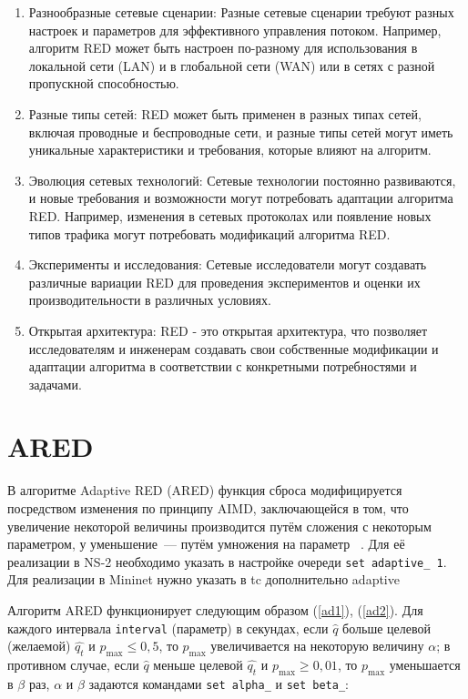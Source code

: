 \begin{enumerate}
\item Разнообразные сетевые сценарии: Разные сетевые сценарии требуют разных настроек и параметров для эффективного управления потоком. Например, алгоритм RED может быть настроен по-разному для использования в локальной сети (LAN) и в глобальной сети (WAN) или в сетях с разной пропускной способностью.
\item Разные типы сетей: RED может быть применен в разных типах сетей, включая проводные и беспроводные сети, и разные типы сетей могут иметь уникальные характеристики и требования, которые влияют на алгоритм.
\item Эволюция сетевых технологий: Сетевые технологии постоянно развиваются, и новые требования и возможности могут потребовать адаптации алгоритма RED. Например, изменения в сетевых протоколах или появление новых типов трафика могут потребовать модификаций алгоритма RED.
\item Эксперименты и исследования: Сетевые исследователи могут создавать различные вариации RED для проведения экспериментов и оценки их производительности в различных условиях.
\item Открытая архитектура: RED - это открытая архитектура, что позволяет исследователям и инженерам создавать свои собственные модификации и адаптации алгоритма в соответствии с конкретными потребностями и задачами.
\end{enumerate}



\section{ARED}
\label{chap2:sec2}


В алгоритме Adaptive RED (ARED) функция сброса модифицируется
посредством изменения по принципу AIMD, заключающейся в том, что
увеличение некоторой величины производится путём сложения с некоторым
параметром, у уменьшение~--- путём умножения на
параметр ~\cite{ARED}. Для её реализации в NS-2 необходимо указать в
настройке очереди \verb|set adaptive_ 1|. Для реализации в Mininet нужно указать в tc дополнительно adaptive

Алгоритм ARED функционирует следующим образом (\ref{ad1}),
(\ref{ad2}). Для каждого интервала \verb|interval| (параметр) в
секундах, если $\hat{q}$ больше целевой (желаемой) $\hat{q_t}$ и
$p_{\max} \leqslant 0,5$, то $p_{\max}$ увеличивается на некоторую
величину $\alpha$; в противном случае, если $\hat{q}$ меньше целевой
$\hat{q_t}$ и $p_{\max}\geqslant 0,01$, то $p_{\max}$ уменьшается в
$\beta$ раз, $\alpha$ и $\beta$ задаются командами \verb|set alpha_| и \verb|set beta_|:

